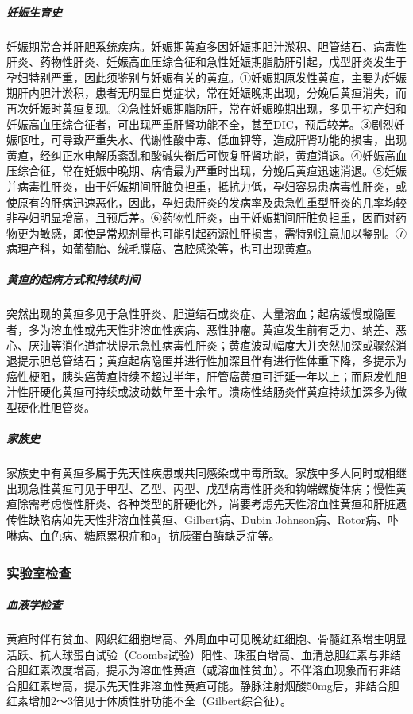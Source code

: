 \subparagraph{妊娠生育史}

妊娠期常合并肝胆系统疾病。妊娠期黄疸多因妊娠期胆汁淤积、胆管结石、病毒性肝炎、药物性肝炎、妊娠高血压综合征和急性妊娠期脂肪肝引起，戊型肝炎发生于孕妇特别严重，因此须鉴别与妊娠有关的黄疸。①妊娠期原发性黄疸，主要为妊娠期肝内胆汁淤积，患者无明显自觉症状，常在妊娠晚期出现，分娩后黄疸消失，而再次妊娠时黄疸复现。②急性妊娠期脂肪肝，常在妊娠晚期出现，多见于初产妇和妊娠高血压综合征者，可出现严重肝肾功能不全，甚至DIC，预后较差。③剧烈妊娠呕吐，可导致严重失水、代谢性酸中毒、低血钾等，造成肝肾功能的损害，出现黄疸，经纠正水电解质紊乱和酸碱失衡后可恢复肝肾功能，黄疸消退。④妊娠高血压综合征，常在妊娠中晚期、病情最为严重时出现，分娩后黄疸迅速消退。⑤妊娠并病毒性肝炎，由于妊娠期间肝脏负担重，抵抗力低，孕妇容易患病毒性肝炎，或使原有的肝病迅速恶化，因此，孕妇患肝炎的发病率及患急性重型肝炎的几率均较非孕妇明显增高，且预后差。⑥药物性肝炎，由于妊娠期间肝脏负担重，因而对药物更为敏感，即使是常规剂量也可能引起药源性肝损害，需特别注意加以鉴别。⑦病理产科，如葡萄胎、绒毛膜癌、宫腔感染等，也可出现黄疸。

\subparagraph{黄疸的起病方式和持续时间}

突然出现的黄疸多见于急性肝炎、胆道结石或炎症、大量溶血；起病缓慢或隐匿者，多为溶血性或先天性非溶血性疾病、恶性肿瘤。黄疸发生前有乏力、纳差、恶心、厌油等消化道症状提示急性病毒性肝炎；黄疸波动幅度大并突然加深或骤然消退提示胆总管结石；黄疸起病隐匿并进行性加深且伴有进行性体重下降，多提示为癌性梗阻，胰头癌黄疸持续不超过半年，肝管癌黄疸可迁延一年以上；而原发性胆汁性肝硬化黄疸可持续或波动数年至十余年。溃疡性结肠炎伴黄疸持续加深多为微型硬化性胆管炎。

\subparagraph{家族史}

家族史中有黄疸多属于先天性疾患或共同感染或中毒所致。家族中多人同时或相继出现急性黄疸可见于甲型、乙型、丙型、戊型病毒性肝炎和钩端螺旋体病；慢性黄疸除需考虑慢性肝炎、各种类型的肝硬化外，尚要考虑先天性溶血性黄疸和肝脏遗传性缺陷病如先天性非溶血性黄疸、Gilbert病、Dubin
Johnson病、Rotor病、卟啉病、血色病、糖原累积症和α\textsubscript{1}
-抗胰蛋白酶缺乏症等。

\subsubsection{实验室检查}

\subparagraph{血液学检查}

黄疸时伴有贫血、网织红细胞增高、外周血中可见晚幼红细胞、骨髓红系增生明显活跃、抗人球蛋白试验（Coombs试验）阳性、珠蛋白增高、血清总胆红素与非结合胆红素浓度增高，提示为溶血性黄疸（或溶血性贫血）。不伴溶血现象而有非结合胆红素增高，提示先天性非溶血性黄疸可能。静脉注射烟酸50mg后，非结合胆红素增加2～3倍见于体质性肝功能不全（Gilbert综合征）。

